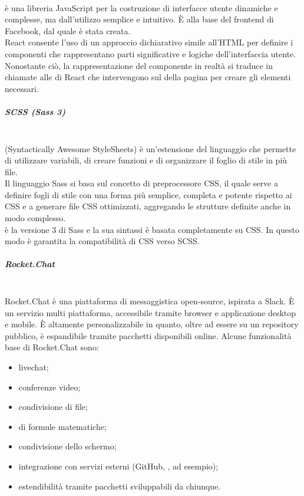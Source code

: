 \mbox{}\\
 è una libreria JavaScript per la costruzione di interfacce utente dinamiche e complesse, ma dall'utilizzo semplice e intuitivo. \`{E} alla base del frontend di Facebook, dal quale è stata creata.\\
React consente l'uso di un approccio dichiarativo simile all'HTML per definire i componenti che rappresentano parti significative e logiche dell'interfaccia utente. Nonostante ciò, la rappresentazione del componente in realtà si traduce in chiamate alle  di React che intervengono sul  della pagina per creare gli elementi necessari.

\subparagraph{SCSS (Sass 3)}\mbox{}\\
 (Syntactically Awesome StyleSheets) è un'estensione del linguaggio  che permette di utilizzare variabili, di creare funzioni e di organizzare il foglio di stile in più file.\\
Il linguaggio Sass si basa sul concetto di preprocessore CSS, il quale serve a definire fogli di stile con una forma più semplice, completa e potente rispetto ai CSS e a generare file CSS ottimizzati, aggregando le strutture definite anche in modo complesso.\\
 è la versione 3 di Sass e la sua sintassi è basata completamente su CSS. In questo modo è garantita la compatibilità di CSS verso SCSS.

\subparagraph{Rocket.Chat}\mbox{}\\
Rocket.Chat è una piattaforma di messaggistica open-source, ispirata a Slack. \`{E} un servizio multi piattaforma, accessibile tramite browser e applicazione desktop e mobile. \`{E} altamente personalizzabile in quanto, oltre ad essere su un repository pubblico, è espandibile tramite pacchetti disponibili online. Alcune funzionalità base di Rocket.Chat sono:
\begin{itemize}
	\item livechat;
	\item conferenze video;
	\item condivisione di file;
	\item {} di formule matematiche;
	\item condivisione dello schermo;
	\item integrazione con servizi esterni (GitHub, ,  ad esempio);
	\item estendibilità tramite pacchetti sviluppabili da chiunque.
\end{itemize}

